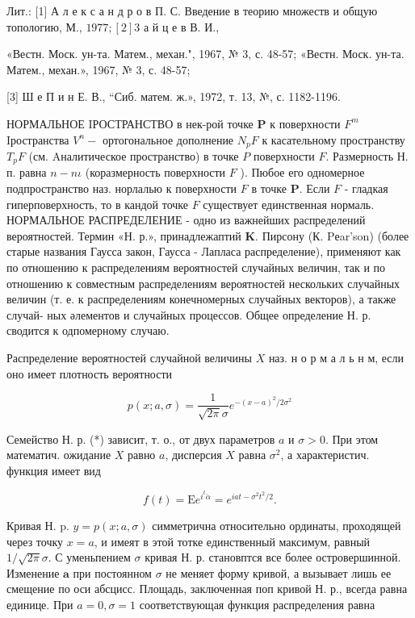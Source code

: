 \documentclass[10pt]{article}
\begin{document}
Лит.: [1] А л е к с а н д р о в П. С. Введение в теорию множеств и общую топологию, М., $1977 ;[2] 3$ а й ц е в В. И.,

«Вестн. Моск. ун-та. Матем., механ.", 1967, № 3, с. 48-57; «Вестн. Моск. ун-та. Матем., механ.», 1967, № 3, с. 48-57;

[3] Ш е П и н Е. В., “Сиб. матем. ж.», 1972, т. 13, №, с. 1182-1196.



НОРМАЛЬНОЕ IРОСТРАНСТВО в нек-рой точке $\boldsymbol{P}$ к поверхности $F^{m}$ Iространства $V^{n}-$ ортогональное дополнение $N_{p} F$ к касательному пространству $T_{p} F$ (см. Aналитическое пространство) в точке $P$ поверхности $F$. Размерность Н. п. равна $n-n \iota$ (коразмерность поверхности $F$ ). Пюбое его одномерное подпространство наз. норлалью к поверхности $F$ в точке $\boldsymbol{P}$. Если $F$ - гладкая гиперповерхность, то в кандой точке $F$ существует единственная нормаль. НОРМАЛЬНОЕ РАСПРЕДЕЛЕНИЕ - одно из важнейших распределений вероятностей. Термин «Н. р.», принадлежаптий $\mathbf{K}$. Пирсону (К. Pеar'son) (более старые названия Гаусса закон, Гаусса - Лапласа распределение), применяют как по отношению к распределениям вероятностей случайных величин, так и по отношению к совместным распределениям вероятностей нескольких случайных величин (т. е. к распределениям конечномерных случайных векторов), а также случай- ных әлементов и случайных процессов. Общее определение Н. р. сводится к одпомерному случаю.



Распределение вероятностей случайной величины $X$ наз. н о р м а л ь н м, если оно имеет плотность вероятности



\[

p(x ; a, \sigma)=\frac{1}{\sqrt{2 \pi} \sigma} e^{-(x-a)^{2} / 2 \sigma^{2}}

\]



Семейство Н. р. (*) зависит, т. о., от двух параметров $a$ и $\sigma>0$. При этом математич. ожидание $X$ равно $a$, дисперсия $X$ равна $\sigma^{2}$, а характеристич. функция имеет вид



\[

f(t)=\mathrm{E} e^{i^{t} \ddot{\alpha}}=e^{i a t-\sigma^{2} t^{2} / 2} .

\]



Кривая Н. p. $y=p(x ; a, \sigma)$ симметрична относительно ординаты, проходящей через точку $x=a$, и имеят в этой тотке единственный максимум, равный $1 / \sqrt{2 \pi} \sigma$. С уменьпением $\sigma$ кривая Н. р. становптся все более островершинной. Изменение $\boldsymbol{a}$ при постоянном $\sigma$ не меняет форму кривой, а вызывает лишь ее смещение по оси абсцисс. Площадь, заключенная поп кривой Н. р., всегда равна единице. При $a=0, \sigma=1$ соответствующая функция распределения равна
\end{document}
